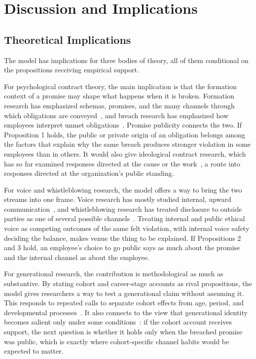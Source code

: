 \documentclass[12pt,a4paper]{article}
\theoremstyle{definition}
\begin{document}
\section{Discussion and Implications}
\subsection{Theoretical Implications}

The model has implications for three bodies of theory, all of them conditional on the propositions receiving empirical support.

For psychological contract theory, the main implication is that the formation context of a promise may shape what happens when it is broken. Formation research has emphasized schemas, promises, and the many channels through which obligations are conveyed~\citep{rousseau2001schema}, and breach research has emphasized how employees interpret unmet obligations~\citep{morrison1997employees,robinson2000development}. Promise publicity connects the two. If Proposition 1 holds, the public or private origin of an obligation belongs among the factors that explain why the same breach produces stronger violation in some employees than in others. It would also give ideological contract research, which has so far examined responses directed at the cause or the work~\citep{yang2022going,deng2023serving}, a route into responses directed at the organization's public standing.

For voice and whistleblowing research, the model offers a way to bring the two streams into one frame. Voice research has mostly studied internal, upward communication~\citep{morrison2014employee,morrison2023employee}, and whistleblowing research has treated disclosure to outside parties as one of several possible channels~\citep{miceli2008whistleblowing,culiberg2017evolution}. Treating internal and public ethical voice as competing outcomes of the same felt violation, with internal voice safety deciding the balance, makes venue the thing to be explained. If Propositions 2 and 3 hold, an employee's choice to go public says as much about the promise and the internal channel as about the employee.

For generational research, the contribution is methodological as much as substantive. By stating cohort and career-stage accounts as rival propositions, the model gives researchers a way to test a generational claim without assuming it. This responds to repeated calls to separate cohort effects from age, period, and developmental processes~\citep{parry2011generational,rudolph2017considering,rudolph2021generations}. It also connects to the view that generational identity becomes salient only under some conditions~\citep{joshi2010unpacking}: if the cohort account receives support, the next question is whether it holds only when the breached promise was public, which is exactly where cohort-specific channel habits would be expected to matter.
\end{document}
